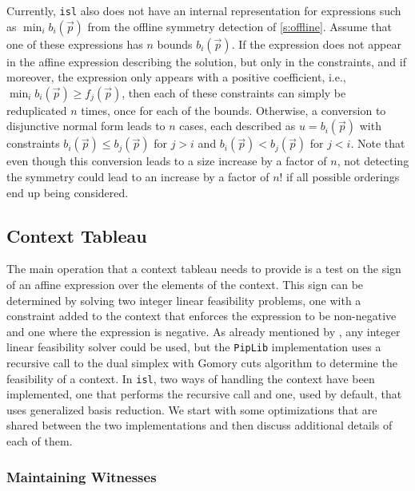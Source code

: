 Currently, {\tt isl} also does not have an internal representation
for expressions such as $\min_i b_i(\vec p)$ from the offline
symmetry detection of \autoref{s:offline}.
Assume that one of these expressions has $n$ bounds $b_i(\vec p)$.
If the expression
does not appear in the affine expression describing the solution,
but only in the constraints, and if moreover, the expression
only appears with a positive coefficient, i.e.,
$\min_i b_i(\vec p) \ge f_j(\vec p)$, then each of these constraints
can simply be reduplicated $n$ times, once for each of the bounds.
Otherwise, a conversion to disjunctive normal form
leads to $n$ cases, each described as $u = b_i(\vec p)$ with constraints
$b_i(\vec p) \le b_j(\vec p)$ for $j > i$
and
$b_i(\vec p)  < b_j(\vec p)$ for $j < i$.
Note that even though this conversion leads to a size increase
by a factor of $n$, not detecting the symmetry could lead to
an increase by a factor of $n!$ if all possible orderings end up being
considered.

\subsection{Context Tableau}\label{s:context}

The main operation that a context tableau needs to provide is a test
on the sign of an affine expression over the elements of the context.
This sign can be determined by solving two integer linear feasibility
problems, one with a constraint added to the context that enforces
the expression to be non-negative and one where the expression is
negative.  As already mentioned by \textcite{Feautrier88parametric},
any integer linear feasibility solver could be used, but the {\tt PipLib}
implementation uses a recursive call to the dual simplex with Gomory
cuts algorithm to determine the feasibility of a context.
In {\tt isl}, two ways of handling the context have been implemented,
one that performs the recursive call and one, used by default, that
uses generalized basis reduction.
We start with some optimizations that are shared between the two
implementations and then discuss additional details of each of them.

\subsubsection{Maintaining Witnesses}\label{s:witness}

